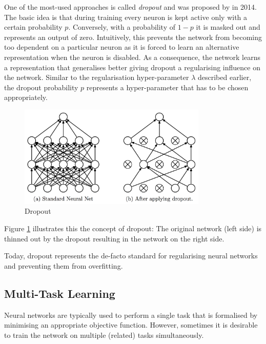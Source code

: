 One of the most-used approaches is called \emph{dropout} and was proposed by  in 2014. The basic idea is that during training every neuron is kept active only with a certain probability $p$. Conversely, with a probability of $1-p$ it is masked out and represents an output of zero. Intuitively, this prevents the network from becoming too dependent on a particular neuron as it is forced to learn an alternative representation when the neuron is disabled. As a consequence, the network learns a representation that generalises better giving dropout a regularising influence on the network. Similar to the regularisation hyper-parameter $\lambda$ described earlier, the dropout probability $p$ represents a hyper-parameter that has to be chosen appropriately.
\begin{figure}[h]
	\centering
	\includegraphics[width=0.8\textwidth]{figures/chapter-2/dropout.png}
		\caption{Dropout}\label{fig:dropout}
\end{figure}


Figure \ref{fig:dropout} illustrates this the concept of dropout: The original network (left side) is thinned out by the dropout resulting in the network on the right side. 

Today, dropout represents the de-facto standard for regularising neural networks and preventing them from overfitting. 


\subsection{Multi-Task Learning}
Neural networks are typically used to perform a single task that is formalised by minimising an appropriate objective function. However, sometimes it is desirable to train the network on multiple (related) tasks simultaneously. 

